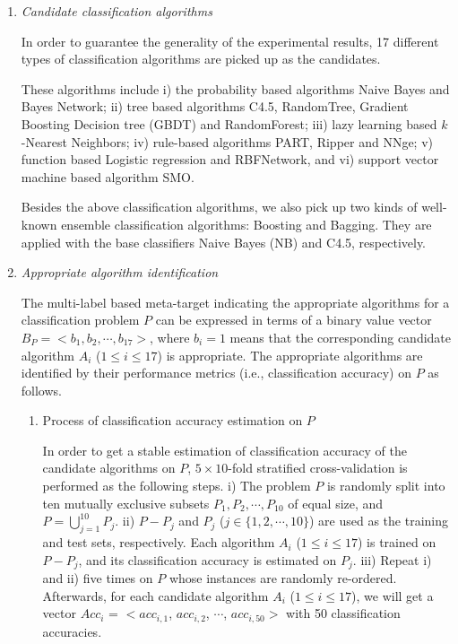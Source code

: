 \documentclass[prodmode,acmtkdd]{acmsmall}
\begin{document}
\begin{enumerate}
    \item \emph{Candidate classification algorithms}

    In order to guarantee the generality of the experimental
    results, 17 different types of classification algorithms are picked up
    as the candidates.

    \quad These algorithms include i) the probability based algorithms Naive Bayes and Bayes Network;
    ii) tree based algorithms C4.5, RandomTree, Gradient Boosting Decision tree (GBDT) and RandomForest; iii) lazy learning based $k$-Nearest Neighbors; iv)
    rule-based algorithms PART, Ripper and NNge; v) function based Logistic regression and RBFNetwork, and vi) support vector machine based algorithm SMO.

    \quad Besides the above classification algorithms, we also pick up two kinds of well-known
    ensemble classification algorithms: Boosting and Bagging. They are applied with the base
    classifiers Naive Bayes (NB) and C4.5, respectively.

    \item \emph{Appropriate algorithm identification}

    The multi-label based meta-target indicating the appropriate algorithms for a classification
    problem $P$ can be expressed in terms of a binary value vector $B_{P} = <b_1, b_2,
    \cdots, b_{17}>$, where $b_i = 1$ means that the corresponding candidate
    algorithm $A_i$ ($1\leq i\leq 17$) is appropriate. The appropriate algorithms are
    identified by their performance metrics (i.e., classification accuracy) on $P$ as follows.

    \begin{enumerate}
        \item {Process of classification accuracy estimation on $P$}

        In order to get a stable estimation of classification accuracy of
        the candidate algorithms on $P$, $5\times10$-fold stratified cross-validation is performed as
        the following steps. i) The problem $P$ is randomly split into ten mutually
        exclusive subsets $P_1, P_2, \cdots, P_{10}$ of equal size, and
        $P = \bigcup_{j=1}^{10} P_j$. ii) $P - P_j$ and $P_j$ ($j \in
        \{1,2,\cdots,10\}$) are used as the training and test sets, respectively.
        Each algorithm $A_i$ ($1\leq i \leq 17$)
        is trained on $P - P_j$, and its classification
        accuracy is estimated on $P_j$. iii) Repeat i) and ii) five times
        on $P$ whose instances are randomly re-ordered. Afterwards,
        for each candidate algorithm $A_i$ ($1\leq i \leq 17$),
        we will get a vector $Acc_i$ = $<acc_{i,1}$, $acc_{i,2}$,
        $\cdots$, $acc_{i,50}>$ with 50 classification accuracies.


\end{enumerate}
\end{enumerate}
\end{document}
